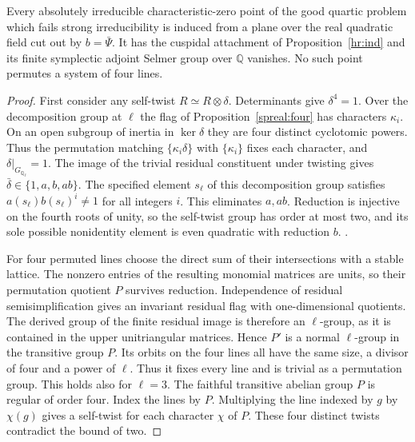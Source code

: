 \begin{corollary}\label{hr:imprimitive}
Every absolutely irreducible characteristic-zero point of the good
quartic problem which fails strong irreducibility is induced from a
plane over the real quadratic field cut out by \(b=\bar\Psi\).
It has the cuspidal attachment of Proposition~\ref{hr:ind} and
its finite symplectic adjoint Selmer group over \(\mathbb Q\)
vanishes. No such point permutes a system of four lines.
\end{corollary}
\begin{proof}
First consider any self-twist \(R\simeq R\otimes\delta\).
Determinants give \(\delta^4=1\). Over the decomposition group
at \(\ell\) the flag of Proposition~\ref{spreal:four} has
characters \(\kappa_i\). On an open subgroup of inertia in
\(\ker\delta\) they are four distinct cyclotomic powers.
Thus the permutation matching \(\{\kappa_i\delta\}\) with
\(\{\kappa_i\}\) fixes each character, and
\(\delta|_{G_{\mathbb Q_\ell}}=1\).
The image of the trivial residual constituent under twisting gives
\(\bar\delta\in\{1,a,b,ab\}\). The specified element \(s_\ell\)
of this decomposition group satisfies
\(a(s_\ell)b(s_\ell)^i\ne1\) for all integers \(i\). This
eliminates \(a,ab\). Reduction is injective on the fourth roots of
unity, so the self-twist group has order at most two, and its sole
possible nonidentity element is even quadratic with reduction \(b\).
.

For four permuted lines choose the direct sum of their intersections
with a stable lattice. The nonzero entries of the resulting monomial
matrices are units, so their permutation quotient \(P\) survives
reduction. Independence of residual semisimplification gives an
invariant residual flag with one-dimensional quotients. The derived
group of the finite residual image is therefore an \(\ell\)-group,
as it is contained in the upper unitriangular matrices. Hence
\(P'\) is a normal \(\ell\)-group in the transitive group \(P\).
Its orbits on the four lines all have the same size, a divisor
of four and a power of \(\ell\). Thus it fixes every line and is
trivial as a permutation group. This holds also for \(\ell=3\).
The faithful transitive abelian group \(P\) is regular of order
four. Index the lines by \(P\). Multiplying the line indexed by
\(g\) by \(\chi(g)\) gives a self-twist for each character
\(\chi\) of \(P\). These four distinct twists contradict the
bound of two.


\end{proof}

